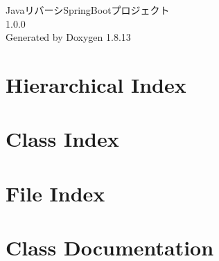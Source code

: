 \documentclass[twoside]{book}
\newcommand{\+}{\discretionary{\mbox{\scriptsize$\hookleftarrow$}}{}{}}
\newcommand{\clearemptydoublepage}{%
  \newpage{\pagestyle{empty}\cleardoublepage}%
}
\begin{document}
\hypersetup{pageanchor=false,
             bookmarksnumbered=true,
             pdfencoding=unicode
            }
\begin{titlepage}
\vspace*{7cm}
\begin{center}%
{\Large Javaリバーシ\+Spring\+Bootプロジェクト \\[1ex]\large 1.\+0.\+0 }\\
\vspace*{1cm}
{\large Generated by Doxygen 1.8.13}\\
\end{center}
\end{titlepage}
\clearemptydoublepage
{}
\tableofcontents
\clearemptydoublepage
{}
\hypersetup{pageanchor=true}

\chapter{Hierarchical Index}

\chapter{Class Index}

\chapter{File Index}

\chapter{Class Documentation}















\end{document}
